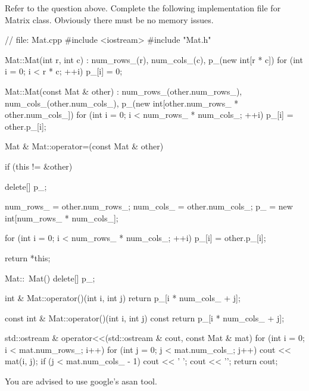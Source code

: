 \nextq
Refer to the question above.
Complete the following implementation file for Matrix class.
Obviously there must be no memory issues.
\\
\ANSWER
\begin{answercode}
// file: Mat.cpp
#include <iostream>
#include "Mat.h"

Mat::Mat(int r, int c)
: num_rows_(r), num_cols_(c), p_(new int[r * c])
{
  for (int i = 0; i < r * c; ++i)
  {
    p_[i] = 0;
  }
}

Mat::Mat(const Mat & other)
: num_rows_(other.num_rows_), num_cols_(other.num_cols_),
p_(new int[other.num_rows_ * other.num_cols_])
{
  for (int i = 0; i < num_rows_ * num_cols_; ++i) {
    p_[i] = other.p_[i];
  }
}

Mat & Mat::operator=(const Mat & other)
{
  if (this != &other)
  {
    delete[] p_;

    num_rows_ = other.num_rows_;
    num_cols_ = other.num_cols_;
    p_ = new int[num_rows_ * num_cols_];

    for (int i = 0; i < num_rows_ * num_cols_; ++i)
    {
      p_[i] = other.p_[i];
    }
  }
  return *this;
}

Mat::~Mat()
{
  delete[] p_;
}

int & Mat::operator()(int i, int j)
{
  return p_[i * num_cols_ + j];
}

const int & Mat::operator()(int i, int j) const
{
  return p_[i * num_cols_ + j];
}

std::ostream & operator<<(std::ostream & cout, const Mat & mat)
{
  for (int i = 0; i < mat.num_rows_; i++)
  {
    for (int j = 0; j < mat.num_cols_; j++)
    {
      cout << mat(i, j);
      if (j < mat.num_cols_ - 1)
      cout << ' ';
    }
    cout << '\n';
  }
  return cout;
}

\end{answercode}
You are advised to use google's asan tool.


